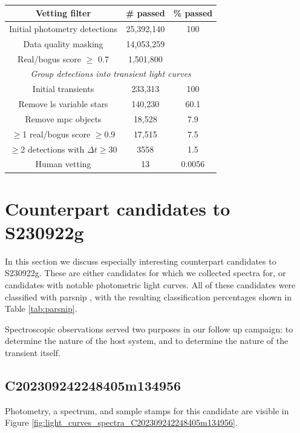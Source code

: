 \documentclass[twocolumn]{aastex631}
\newcommand{\gweventid}{S230922g}
\begin{document}
\begin{table}[]
    \centering
    \begin{tabular}{c|c|c}
        Vetting filter & \# passed & \% passed \\
        \hline
        Initial photometry detections & 25,392,140 & 100 \\
        Data quality masking & 14,053,259 &  \\
        Real/bogus score $\ge$ 0.7 & 1,501,800 &  \\
        \hline 
        \multicolumn{3}{c}{\textit{Group detections into transient light curves}} \\
        \hline
        Initial transients & 233,313 & 100 \\
        Remove \gls{ls} variable stars & 140,230 & 60.1 \\
        Remove \gls{mpc} objects & 18,528 & 7.9 \\
        $\ge$1 real/bogus score $\ge$0.9 & 17,515 & 7.5 \\
        $\ge$2 detections with $\Delta t \ge 30$ & 3558 & 1.5 \\
        Human vetting & 13 & 0.0056
    \end{tabular}
    \caption{}
    \label{tab:vetting}
\end{table}

\section{Counterpart candidates to S230922g}

In this section we discuss especially interesting counterpart candidates to \gweventid{}.
These are either candidates for which we collected spectra for, or candidates with notable photometric light curves.
All of these candidates were classified with \gls{parsnip} \citep{booneParSNIPGenerativeModels2021}, with the resulting classification percentages shown in Table \ref{tab:parsnip}.

Spectroscopic observations served two purposes in our follow up campaign: to determine the nature of the host system, and to determine the nature of the transient itself.


\subsection{C202309242248405m134956}

Photometry, a spectrum, and sample stamps for this candidate are visible in Figure \ref{fig:light_curves_spectra_C202309242248405m134956}.
\end{document}
